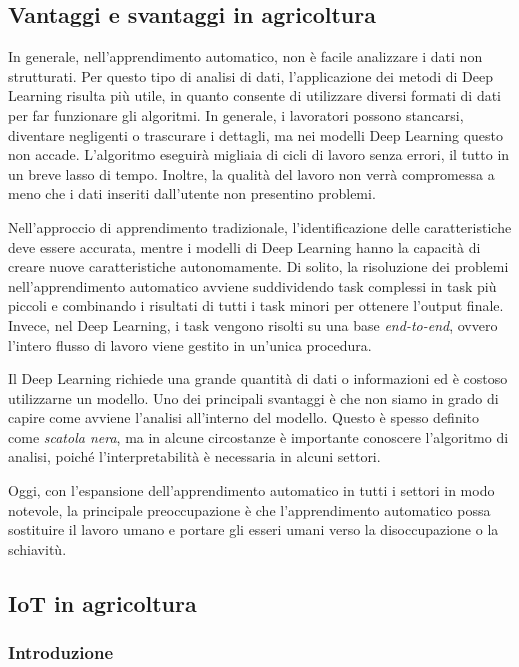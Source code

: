 \subsection{Vantaggi e svantaggi in agricoltura}

In generale, nell'apprendimento automatico, non è facile analizzare i dati non strutturati. Per questo tipo di analisi di dati, l'applicazione dei metodi di Deep Learning risulta più utile, in quanto consente di utilizzare diversi formati di dati per far funzionare gli algoritmi. In generale, i lavoratori possono stancarsi, diventare negligenti o trascurare i dettagli, ma nei modelli Deep Learning questo non accade. L'algoritmo eseguirà migliaia di cicli di lavoro senza errori, il tutto in un breve lasso di tempo. Inoltre, la qualità del lavoro non verrà compromessa a meno che i dati inseriti dall'utente non presentino problemi.

Nell'approccio di apprendimento tradizionale, l'identificazione delle caratteristiche deve essere accurata, mentre i modelli di Deep Learning hanno la capacità di creare nuove caratteristiche autonomamente. Di solito, la risoluzione dei problemi nell'apprendimento automatico avviene suddividendo task complessi in task più piccoli e combinando i risultati di tutti i task minori per ottenere l'output finale. Invece, nel Deep Learning, i task vengono risolti su una base \textit{end-to-end}, ovvero l'intero flusso di lavoro viene gestito in un'unica procedura.

Il Deep Learning richiede una grande quantità di dati o informazioni ed è costoso utilizzarne un modello. Uno dei principali svantaggi è che non siamo in grado di capire come avviene l'analisi all'interno del modello. Questo è spesso definito come \textit{scatola nera}, ma in alcune circostanze è importante conoscere l'algoritmo di analisi, poiché l'interpretabilità è necessaria in alcuni settori.

Oggi, con l'espansione dell'apprendimento automatico in tutti i settori in modo notevole, la principale preoccupazione è che l'apprendimento automatico possa sostituire il lavoro umano e portare gli esseri umani verso la disoccupazione o la schiavitù.

\subsection{IoT in agricoltura}
\subsubsection{Introduzione}

